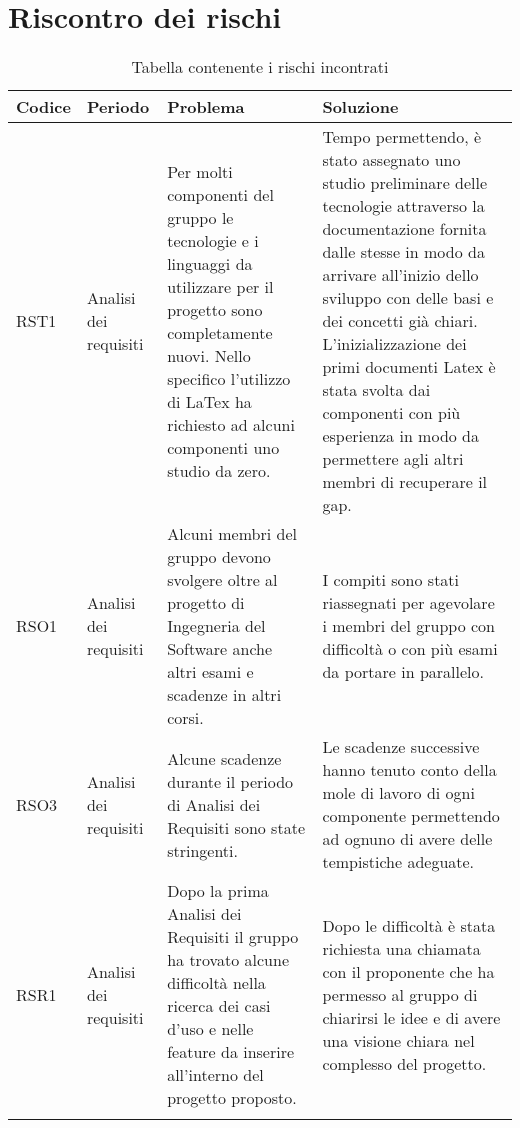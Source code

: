 \appendix
\section{Riscontro dei rischi} \label{_riscontroDeiRischi}
\begin{center}
			\begin{longtable}{p{2cm}|p{3cm}|p{4cm}|p{4cm}|}
			\hline
			\rowcolor{lighter-grayer}
			\textbf{Codice} & \textbf{Periodo} & \textbf{Problema} & \textbf{Soluzione} \\
			\hline
			\endfirsthead

			\hline
			RST1 & Analisi dei requisiti & Per molti componenti del gruppo le tecnologie e i linguaggi da utilizzare per il progetto sono completamente nuovi. Nello specifico l'utilizzo di LaTex ha richiesto ad alcuni componenti uno studio da zero. & Tempo permettendo, è stato assegnato uno studio preliminare delle tecnologie attraverso la documentazione fornita dalle stesse in modo da arrivare all'inizio dello sviluppo con delle basi e dei concetti già chiari. L'inizializzazione dei primi documenti Latex è stata svolta dai componenti con più esperienza in modo da permettere agli altri membri di recuperare il gap. \\
			\hline
			RSO1 & Analisi dei requisiti & Alcuni membri del gruppo devono svolgere oltre al progetto di Ingegneria del Software anche altri esami e scadenze in altri corsi. & I compiti sono stati riassegnati per agevolare i membri del gruppo con difficoltà o con più esami da portare in parallelo. \\
			\hline
			RSO3 & Analisi dei requisiti & Alcune scadenze durante il periodo di Analisi dei Requisiti sono state stringenti. & Le scadenze successive hanno tenuto conto della mole di lavoro di ogni componente permettendo ad ognuno di avere delle tempistiche adeguate. \\
			\hline
			RSR1 & Analisi dei requisiti & Dopo la prima Analisi dei Requisiti il gruppo ha trovato alcune difficoltà nella ricerca dei casi d'uso e nelle feature da inserire all'interno del progetto proposto. & Dopo le difficoltà è stata richiesta una chiamata con il proponente che ha permesso al gruppo di chiarirsi le idee e di avere una visione chiara nel complesso del progetto. \\
			\rowcolors{white} \caption{Tabella contenente i rischi incontrati}
	\end{longtable}
\end{center}